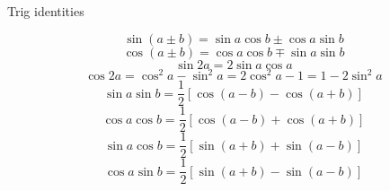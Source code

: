 Trig identities

$$\sin(a\pm b)=\sin a\cos b\pm\cos a\sin b$$
$$\cos(a\pm b)=\cos a\cos b\mp\sin a\sin b$$
$$\sin2a=2\sin a\cos a$$
$$\cos2a=\cos^2a-\sin^2a=2\cos^2a-1=1-2\sin^2a$$
$$\sin a\sin b=\frac{1}{2}\left[\cos(a-b)-\cos(a+b)\right]$$
$$\cos a\cos b=\frac{1}{2}\left[\cos(a-b)+\cos(a+b)\right]$$
$$\sin a\cos b=\frac{1}{2}\left[\sin(a+b)+\sin(a-b)\right]$$
$$\cos a\sin b=\frac{1}{2}\left[\sin(a+b)-\sin(a-b)\right]$$

